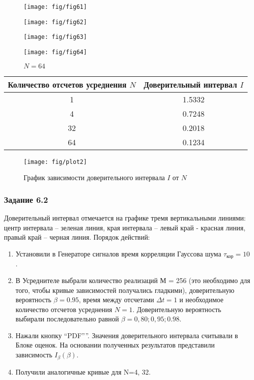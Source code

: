 \documentclass[a4paper,14pt]{extarticle}
\begin{document}
 \begin{figure}[H]
	\begin{minipage}{.5\linewidth}
		\centering
       \texttt{[image: fig/fig61]}
	\caption*{$N = 1$}
	\end{minipage}
	\begin{minipage}{.5\linewidth}
		\centering
        \texttt{[image: fig/fig62]}
	\caption*{$N = 4$}
	\end{minipage}
	\begin{minipage}{.5\linewidth}
		\centering
        \texttt{[image: fig/fig63]}
	\caption*{$N = 32$}
	\end{minipage}
	\begin{minipage}{.5\linewidth}
		\centering
        \texttt{[image: fig/fig64]}
	\caption*{$N = 64$}
	\end{minipage}
\end{figure}
\begin{table}[htbp]
	\centering
	\begin{tabular}{|c|c|}
		\toprule
		\multicolumn{1}{|c|}{\textbf{Количество отсчетов усреднения $N$}} & \textbf{Доверительный интервал $I$} \\
		\midrule
		1     & 1.5332 \\
		\midrule
		4     & 0.7248 \\
		\midrule
		32    & 0.2018 \\
		\midrule
		64    & 0.1234 \\
		\bottomrule
	\end{tabular}%
	\label{tab:addlabel}%
\end{table}%
 \begin{figure}[H]
	\centering
    \texttt{[image: fig/plot2]}
	\caption*{График зависимости доверительного интервала $I$ от $N$}
	\end{figure}
\subsubsection[Задание 6.1]{Задание 6.2}
Доверительный интервал отмечается на графике тремя вертикальными линиями: центр интервала – зеленая линия, края интервала – левый край - красная линия, правый край – черная линия.
Порядок действий:
\begin{enumerate}
	\item Установили в Генераторе сигналов время корреляции Гауссова шума $\tau_\text{кор}=10$.
	\item В Усреднителе выбрали количество реализаций М = 256 (это необходимо для того, чтобы кривые зависимостей получались гладкими), доверительную вероятность $\beta = 0.95$, время между отсчетами $\Delta t = 1$ и необходимое количество отсчетов усреднения $N=1$. Доверительную вероятность выбирали последовательно равной $\beta = 0,80; 0,95; 0.98$.
	\item Нажали кнопку “PDF””. Значения доверительного интервала считывали в Блоке оценок. На основании полученных результатов представили зависимость $I_{\beta}(\beta)$.
	\item Получили аналогичные кривые для N=4, 32.
\end{enumerate}
\end{document}
